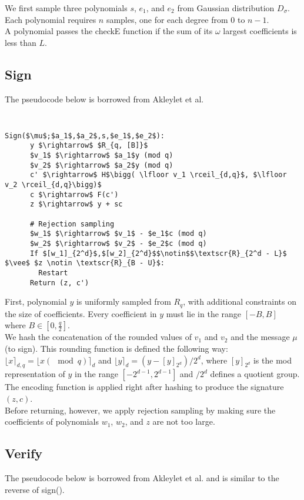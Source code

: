 \documentclass[letterpaper,twocolumn,10pt]{article}
\begin{document}
We first sample three polynomials $s$, $e_1$, and $e_2$ from Gaussian distribution $D_{\sigma}$. Each polynomial requires $n$ samples, one for each degree from $0$ to $n-1$.\\
A polynomial passes the checkE function if the sum of its $\omega$ largest coefficients is less than $L$.\\

\subsection{Sign}
The pseudocode below is borrowed from Akleylet et al. \cite{rTesla}
{\tt \small
  \begin{lstlisting}[mathescape, columns=flexible]
    Sign($\mu$;$a_1$,$a_2$,s,$e_1$,$e_2$):
      y $\rightarrow$ $R_{q, [B]}$
      $v_1$ $\rightarrow$ $a_1$y (mod q)
      $v_2$ $\rightarrow$ $a_2$y (mod q)
      c' $\rightarrow$ H$\bigg( \lfloor v_1 \rceil_{d,q}$, $\lfloor v_2 \rceil_{d,q}\bigg)$
      c $\rightarrow$ F(c')
      z $\rightarrow$ y + sc

      # Rejection sampling
      $w_1$ $\rightarrow$ $v_1$ - $e_1$c (mod q)
      $w_2$ $\rightarrow$ $v_2$ - $e_2$c (mod q)     
      If $[w_1]_{2^d}$,$[w_2]_{2^d}$$\notin$$\textscr{R}_{2^d - L}$ $\vee$ $z \notin \textscr{R}_{B - U}$:
        Restart
      Return (z, c')
  \end{lstlisting}
}

  First, polynomial $y$ is uniformly sampled from $R_q$, with additional constraints on the size of coefficients. Every coefficient in $y$ must lie in the range $[-B, B]$ where $B \in [0, \frac{q}{2}]$. \\
  We hash the concatenation of the rounded values of $v_1$ and $v_2$ and the message $\mu$ (to sign). This rounding function is defined the following way: $\lfloor x \rceil_{d, q} = \lfloor x (\mod q) \rceil_{d}$ and $\lfloor y \rceil_{d} = (y - [y]_{2^d}) / 2^d$, where $[y]_{2^d}$ is the mod representation of $y$ in the range $[-2^{d-1}, 2^{d-1}]$ and $/ 2^d$ defines a quotient group.\\
  The encoding function is applied right after hashing to produce the signature $(z, c)$.\\
  Before returning, however, we apply rejection sampling by making sure the coefficients of polynomials $w_1$, $w_2$, and $z$ are not too large.

\subsection{Verify}
The pseudocode below is borrowed from Akleylet et al. \cite{rTesla} and is similar to the reverse of sign().
\end{document}

